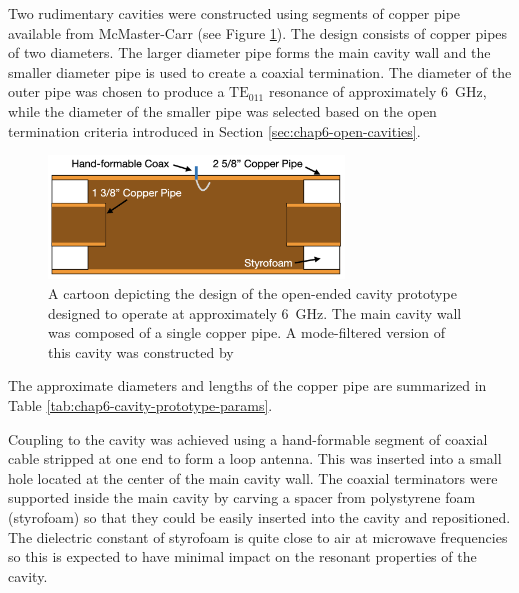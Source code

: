 Two rudimentary cavities were constructed using segments of copper pipe available from McMaster-Carr (see Figure \ref{fig:toy-cavity-cartoon}). The design consists of copper pipes of two diameters. The larger diameter pipe forms the main cavity wall and the smaller diameter pipe is used to create a coaxial termination. The diameter of the outer pipe was chosen to produce a $\mathrm{TE}_{011}$ resonance of approximately 6~GHz, while the diameter of the smaller pipe was selected based on the open termination criteria introduced in Section \ref{sec:chap6-open-cavities}.
\begin{figure}[htbp]
    \centering
    \includegraphics*[width=0.7\textwidth]{figs/Chapter-6/230612_toy_cavity_cartoon.png}
    \caption{\label{fig:toy-cavity-cartoon} A cartoon depicting the design of the open-ended cavity prototype designed to operate at approximately 6~GHz. The main cavity wall was composed of a single copper pipe. A mode-filtered version of this cavity was constructed by }
\end{figure}
The approximate diameters and lengths of the copper pipe are summarized in Table \ref{tab:chap6-cavity-prototype-params}. 

Coupling to the cavity was achieved using a hand-formable segment of coaxial cable stripped at one end to form a loop antenna. This was inserted into a small hole located at the center of the main cavity wall. The coaxial terminators were supported inside the main cavity by carving a spacer from polystyrene foam (styrofoam) so that they could be easily inserted into the cavity and repositioned. The dielectric constant of styrofoam is quite close to air at microwave frequencies so this is expected to have minimal impact on the resonant properties of the cavity. 

